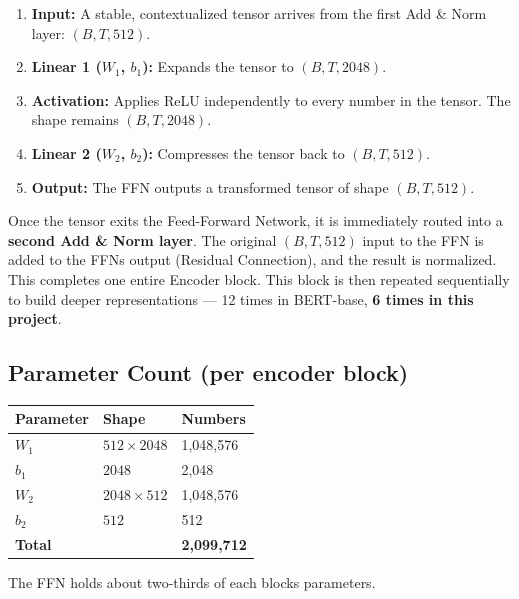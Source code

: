 \documentclass[11pt,a4paper,oneside]{report}
\providecommand{\tightlist}{\setlength{\itemsep}{0pt}\setlength{\parskip}{0pt}}
\begin{document}
\begin{enumerate}
\def\labelenumi{\arabic{enumi}.}
\tightlist
\item
  \textbf{Input:} A stable, contextualized tensor arrives from the first Add \& Norm layer: \textbf{\((B, T, 512)\)}.
\item
  \textbf{Linear 1 (\(W_1\), \(b_1\)):} Expands the tensor to \textbf{\((B, T, 2048)\)}.
\item
  \textbf{Activation:} Applies ReLU independently to every number in the tensor. The shape remains \textbf{\((B, T, 2048)\)}.
\item
  \textbf{Linear 2 (\(W_2\), \(b_2\)):} Compresses the tensor back to \textbf{\((B, T, 512)\)}.
\item
  \textbf{Output:} The FFN outputs a transformed tensor of shape \textbf{\((B, T, 512)\)}.
\end{enumerate}

Once the tensor exits the Feed-Forward Network, it is immediately routed into a \textbf{second Add \& Norm layer}. The original \((B, T, 512)\) input to the FFN is added to the FFN\textquotesingle s output (Residual Connection), and the result is normalized. This completes one entire Encoder block. This block is then repeated sequentially to build deeper representations --- 12 times in BERT-base, \textbf{6 times in this project}.

\subsection{Parameter Count (per encoder block)}\label{parameter-count-per-encoder-block}

{\def\LTcaptype{none} %
\begin{longtable}[]{@{}lll@{}}
\toprule\noalign{}
Parameter & Shape & Numbers \\
\midrule\noalign{}
\endhead
\bottomrule\noalign{}
\endlastfoot
\(W_1\) & \(512 \times 2048\) & 1,048,576 \\
\(b_1\) & \(2048\) & 2,048 \\
\(W_2\) & \(2048 \times 512\) & 1,048,576 \\
\(b_2\) & \(512\) & 512 \\
\textbf{Total} & & \textbf{2,099,712} \\
\end{longtable}
}

The FFN holds about two-thirds of each block\textquotesingle s parameters.
\end{document}
